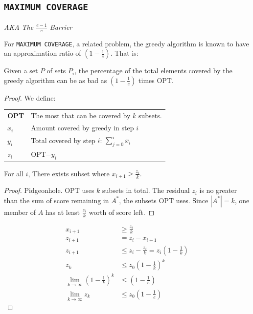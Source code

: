 \subsection{\texttt{MAXIMUM COVERAGE}}

\textit{AKA The $\frac{e-1}{e}$ Barrier}

For \texttt{MAXIMUM COVERAGE}, a related problem, the greedy algorithm is known to have an approximation ratio of  $(1-\frac{1}{e})$.  That is: 

\begin{thm} Given a set $P$ of sets $P_i$, the percentage of the total elements covered by the greedy algorithm can be as bad as $(1-\frac{1}{e})$ times OPT.
\end{thm}

\begin{proof} We define:

\begin{tabularx}{\linewidth}{l X}
{\bf OPT} & The most that can be covered by $k$ subsets. \\
{\bf $x_i$} & Amount covered by greedy in step $i$ \\
{\bf $y_i$} & Total covered by step $i$: $\sum_{j=0}^i x_i$ \\
{\bf $z_i$} & OPT$-y_i$ \\
\end{tabularx}

\begin{lem} \label{lem:MaxPidgeonhole}
For all $i$,  There exists subset where $x_{i+1} \geq \frac{z_i}{k}$.  
\end{lem}

\begin{proof}
Pidgeonhole.  OPT uses $k$ subsets in total.  The residual $z_i$ is no greater than the sum of score remaining in $A^*$, the subsets OPT uses. Since $ |A^*| = k$, one member of $A$ has at least $ \frac{z_i}{k}$ worth of score left. 
\end{proof}

\begin{eqnarray*}
x_{i+1} &\geq \frac{z_i}{k} \\
z_{i+1} &= z_i - x_{i+1} \\
z_{i+1} &\leq z_i - \frac{z_i}{k} = z_i( 1 - \frac{1}{k} ) \\
z_k    &\leq z_0 ( 1 - \frac{1}{k} )^k \\
\lim_{k \rightarrow \infty} ( 1 - \frac{1}{k} )^k &\leq ( 1 - \frac{1}{e}) \\
\lim_{k \rightarrow \infty} z_k &\leq z_0(1 -  \frac{1}{e}) 
\end{eqnarray*}

\end{proof}

